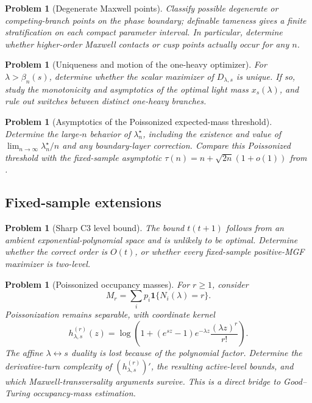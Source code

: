 \documentclass[11pt]{article}
\theoremstyle{plain}
\newtheorem{problem}[theorem]{Problem}
\theoremstyle{definition}
\theoremstyle{remark}
\newcommand{\one}{\mathbf 1}
\begin{document}
\begin{problem}[Degenerate Maxwell points]
Classify possible degenerate or competing-branch points on the phase boundary; definable tameness gives a finite stratification on each compact parameter interval.  In particular, determine whether higher-order Maxwell contacts or cusp points actually occur for any \(n\).
\end{problem}


\begin{problem}[Uniqueness and motion of the one-heavy optimizer]
For \(\lambda>\beta_n(s)\), determine whether the scalar maximizer of \(D_{\lambda,s}\) is unique.  If so, study the monotonicity and asymptotics of the optimal light mass \(x_s(\lambda)\), and rule out switches between distinct one-heavy branches.
\end{problem}

\begin{problem}[Asymptotics of the Poissonized expected-mass threshold]
Determine the large-\(n\) behavior of \(\lambda_n^\star\), including the existence and value of \(\lim_{n\to\infty}\lambda_n^\star/n\) and any boundary-layer correction.  Compare this Poissonized threshold with the fixed-sample asymptotic \(\tau(n)=n+\sqrt{2n}(1+o(1))\) from \cite{BerendKontorovich2012}.
\end{problem}

\subsection{Fixed-sample extensions}

\begin{problem}[Sharp C3 level bound]
The bound \(t(t+1)\) follows from an ambient exponential-polynomial space and is unlikely to be optimal.  Determine whether the correct order is \(O(t)\), or whether every fixed-sample positive-MGF maximizer is two-level.
\end{problem}

\begin{problem}[Poissonized occupancy masses]
For \(r\ge1\), consider
\[
M_r=\sum_i p_i\one\{N_i(\lambda)=r\}.
\]
Poissonization remains separable, with coordinate kernel
\[
h^{(r)}_{\lambda,s}(z)
=\log\left(1+(e^{sz}-1)e^{-\lambda z}
\frac{(\lambda z)^r}{r!}\right).
\]
The affine \(\lambda\leftrightarrow s\) duality is lost because of the polynomial factor.  Determine the derivative-turn complexity of \((h^{(r)}_{\lambda,s})'\), the resulting active-level bounds, and which Maxwell-transversality arguments survive.  This is a direct bridge to Good--Turing occupancy-mass estimation.
\end{problem}
\end{document}
